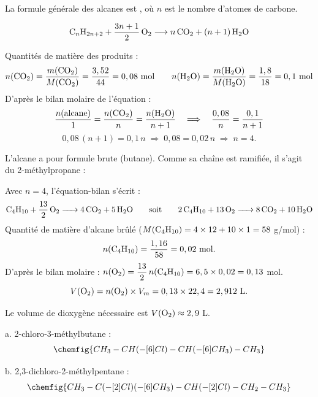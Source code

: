 \newcommand{\matiere}{Chimie : les alcanes (correction)}





La formule générale des alcanes est , où $n$ est le nombre d'atomes de carbone.

\[
\ce{C_nH_{2n+2}} + \frac{3n+1}{2}\,\ce{O2} \longrightarrow n\,\ce{CO2} + (n+1)\,\ce{H2O}
\]

Quantités de matière des produits :
\[
n(\ce{CO2}) = \frac{m(\ce{CO2})}{M(\ce{CO2})} = \frac{3,52}{44} = 0,08 \text{ mol}
\qquad
n(\ce{H2O}) = \frac{m(\ce{H2O})}{M(\ce{H2O})} = \frac{1,8}{18} = 0,1 \text{ mol}
\]
D'après le bilan molaire de l'équation :
\[
\frac{n(\text{alcane})}{1} = \frac{n(\ce{CO2})}{n} = \frac{n(\ce{H2O})}{n+1}
\quad\Longrightarrow\quad
\frac{0,08}{n} = \frac{0,1}{n+1}
\]
\[
0,08\,(n+1) = 0,1\,n \;\Longrightarrow\; 0,08 = 0,02\,n \;\Longrightarrow\; n = 4.
\]
\begin{resultat}
L'alcane a pour formule brute  (butane). Comme sa chaîne est ramifiée, il s'agit du
2-méthylpropane : 
\end{resultat}

Avec $n = 4$, l'équation-bilan s'écrit :
\[
\ce{C4H10 + \frac{13}{2} O2 -> 4 CO2 + 5 H2O}
\qquad\text{soit}\qquad
\ce{2 C4H10 + 13 O2 -> 8 CO2 + 10 H2O}
\]
Quantité de matière d'alcane brûlé ($M(\ce{C4H10}) = 4\times 12 + 10\times 1 = 58$ g/mol) :
\[
n(\ce{C4H10}) = \frac{1,16}{58} = 0,02 \text{ mol.}
\]
D'après le bilan molaire : $n(\ce{O2}) = \dfrac{13}{2}\, n(\ce{C4H10}) = 6,5 \times 0,02 = 0,13$ mol.
\[
V(\ce{O2}) = n(\ce{O2}) \times V_m = 0,13 \times 22,4 = 2,912 \text{ L.}
\]
\begin{resultat}
Le volume de dioxygène nécessaire est $V(\ce{O2}) \approx 2,9$ L.
\end{resultat}


a. 2-chloro-3-méthylbutane :
\[\chemfig{CH_3-CH(-[6]Cl)-CH(-[6]CH_3)-CH_3}\]

b. 2,3-dichloro-2-méthylpentane :
\[\chemfig{CH_3-C(-[2]Cl)(-[6]CH_3)-CH(-[2]Cl)-CH_2-CH_3}\]

